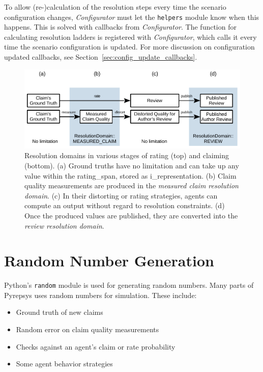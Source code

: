 \documentclass[%
    ]{\PathToTumTemplate/thesis/tum_thesis}
\begin{document}
To allow (re-)calculation of the resolution steps every time the scenario configuration changes, \emph{Configurator} must let the \lstinline{helpers} module know when this happens.
This is solved with callbacks from \emph{Configurator}.
The function for calculating resolution ladders is registered with \emph{Configurator}, which calls it every time the scenario configuration is updated.
For more discussion on configuration updated callbacks, see Section~\ref{sec:config_update_callbacks}.

\begin{figure}[tbp]
  \begin{center}
        \includegraphics[width=1\linewidth]	{../images/resolution_domains-crop.pdf}
    \caption{
    Resolution domains in various stages of rating (top) and claiming (bottom).
    (a) Ground truths have no limitation and can take up any value within the \gls{rating_span}, stored as \gls{i_representation}.
    (b) Claim quality measurements are produced in the \emph{measured claim resolution domain}.
    (c) In their distorting or rating strategies, agents can compute an output without regard to resolution constraints.
    (d) Once the produced values are published, they are converted into the \emph{review resolution domain}.
    }
    \label{fig:resolution_domains}
  \end{center}
\end{figure}



\section{Random Number Generation}\label{sec:impl_rng}

Python's \lstinline{random} module is used for generating random numbers.
Many parts of Pyrepsys uses random numbers for simulation.
These include:
\begin{itemize}
	\item Ground truth of new claims
	\item Random error on claim quality measurements
	\item Checks against an agent's claim or rate probability
	\item Some agent behavior strategies
\end{itemize}
\end{document}
